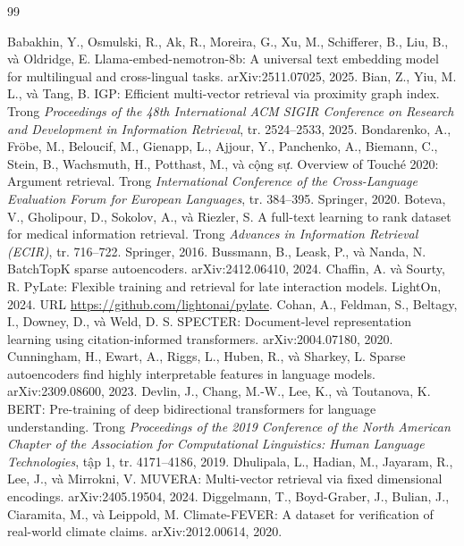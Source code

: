 \documentclass[a4paper,13pt]{extreport}
\theoremstyle{plain}
\begin{document}
\begin{thebibliography}{99}
\singlespacing
{} Babakhin, Y., Osmulski, R., Ak, R., Moreira, G., Xu, M., Schifferer, B., Liu, B., và Oldridge, E. Llama-embed-nemotron-8b: A universal text embedding model for multilingual and cross-lingual tasks. arXiv:2511.07025, 2025.
 Bian, Z., Yiu, M. L., và Tang, B. IGP: Efficient multi-vector retrieval via proximity graph index. Trong \emph{Proceedings of the 48th International ACM SIGIR Conference on Research and Development in Information Retrieval}, tr. 2524--2533, 2025.
 Bondarenko, A., Fröbe, M., Beloucif, M., Gienapp, L., Ajjour, Y., Panchenko, A., Biemann, C., Stein, B., Wachsmuth, H., Potthast, M., và cộng sự. Overview of Touché 2020: Argument retrieval. Trong \emph{International Conference of the Cross-Language Evaluation Forum for European Languages}, tr. 384--395. Springer, 2020.
 Boteva, V., Gholipour, D., Sokolov, A., và Riezler, S. A full-text learning to rank dataset for medical information retrieval. Trong \emph{Advances in Information Retrieval (ECIR)}, tr. 716--722. Springer, 2016.
 Bussmann, B., Leask, P., và Nanda, N. BatchTopK sparse autoencoders. arXiv:2412.06410, 2024.
 Chaffin, A. và Sourty, R. PyLate: Flexible training and retrieval for late interaction models. LightOn, 2024. URL \url{https://github.com/lightonai/pylate}.
 Cohan, A., Feldman, S., Beltagy, I., Downey, D., và Weld, D. S. SPECTER: Document-level representation learning using citation-informed transformers. arXiv:2004.07180, 2020.
 Cunningham, H., Ewart, A., Riggs, L., Huben, R., và Sharkey, L. Sparse autoencoders find highly interpretable features in language models. arXiv:2309.08600, 2023.
 Devlin, J., Chang, M.-W., Lee, K., và Toutanova, K. BERT: Pre-training of deep bidirectional transformers for language understanding. Trong \emph{Proceedings of the 2019 Conference of the North American Chapter of the Association for Computational Linguistics: Human Language Technologies}, tập 1, tr. 4171--4186, 2019.
 Dhulipala, L., Hadian, M., Jayaram, R., Lee, J., và Mirrokni, V. MUVERA: Multi-vector retrieval via fixed dimensional encodings. arXiv:2405.19504, 2024.
 Diggelmann, T., Boyd-Graber, J., Bulian, J., Ciaramita, M., và Leippold, M. Climate-FEVER: A dataset for verification of real-world climate claims. arXiv:2012.00614, 2020.

\end{thebibliography}
\end{document}
